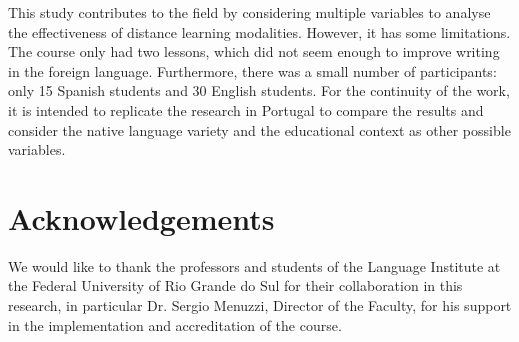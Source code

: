 \documentclass{textolivre}
\begin{document}
This study contributes to the field by considering multiple variables to
analyse the effectiveness of distance learning modalities. However, it
has some limitations. The course only had two lessons, which did not
seem enough to improve writing in the foreign language. Furthermore,
there was a small number of participants: only 15 Spanish students and
30 English students. For the continuity of the work, it is intended to
replicate the research in Portugal to compare the results and consider
the native language variety and the educational context as other
possible variables.

\section*{Acknowledgements}
We would like to thank the professors and students of the Language
Institute at the Federal University of Rio Grande do Sul for their
collaboration in this research, in particular Dr. Sergio Menuzzi,
Director of the Faculty, for his support in the implementation and
accreditation of the course.


\printbibliography\label{sec-bib}
\end{document}
